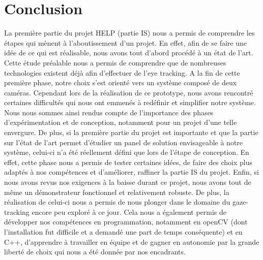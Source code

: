 \section*{Conclusion}

La première partie du projet HELP (partie IS) nous a permis de comprendre les étapes qui mènent à l’aboutissement d’un projet. En effet, afin de se faire une idée de ce qui est réalisable, nous avons tout d’abord procédé à un état de l’art. Cette étude préalable nous a permis de comprendre que de nombreuses technologies existent déjà afin d’effectuer de l’eye tracking. A la fin de cette première phase, notre choix s’est orienté vers un système composé de deux caméras. Cependant lors de la réalisation de ce prototype, nous avons rencontré certaines difficultés qui nous ont emmenés à redéfinir et simplifier notre système. Nous nous sommes ainsi rendus compte de l’importance des phases d’expérimentation et de conception, notamment pour un projet d’une telle envergure. 
\bigbreak
De plus, si la première partie du projet est importante et que la partie sur l’état de l’art permet d’étudier un panel de solution envisageable à notre système, celui-ci n’a été réellement défini que lors de l'étape de conception. En effet, cette phase nous a permis de tester certaines idées, de faire des choix plus adaptés à nos compétences et d’améliorer, raffiner la partie IS du projet.
\bigbreak
Enfin, si nous avons revus nos exigences à la baisse durant ce projet, nous avons tout de même un démonstrateur fonctionnel et relativement robuste. De plus, la réalisation de celui-ci nous a permis de nous plonger dans le domaine du gaze-tracking encore peu exploré à ce jour. Cela nous a également permis de développer nos compétences en programmation, notamment en openCV (dont l'installation fut difficile et a demandé une part de temps conséquente) et en C++, d'apprendre à travailler en équipe et de gagner en autonomie par la grande liberté de choix qui nous a été donnée par nos encadrants. 
